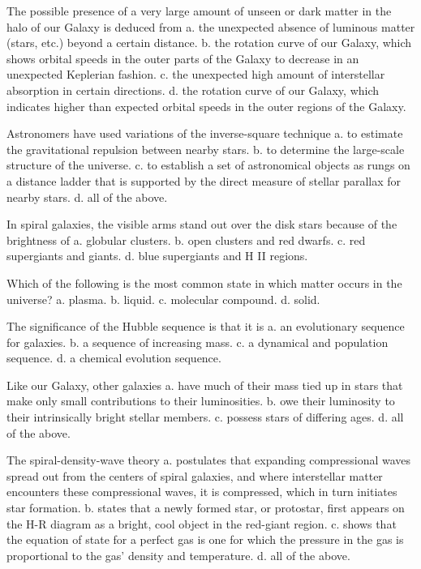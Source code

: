     The possible presence of a very large amount of unseen or dark matter in the halo of our Galaxy is deduced from
    a. the unexpected absence of luminous matter (stars, etc.) beyond a certain distance.
    b. the rotation curve of our Galaxy, which shows orbital speeds in the outer parts of the Galaxy to decrease in an unexpected Keplerian fashion.
    c. the unexpected high amount of interstellar absorption in certain directions.
    d. the rotation curve of our Galaxy, which indicates higher than expected orbital speeds in the outer regions of the Galaxy.

    Astronomers have used variations of the inverse-square technique
    a. to estimate the gravitational repulsion between nearby stars.
    b. to determine the large-scale structure of the universe.
    c. to establish a set of astronomical objects as rungs on a distance ladder that is supported by the direct measure of stellar parallax for nearby stars.
    d. all of the above.

    In spiral galaxies, the visible arms stand out over the disk stars because of the brightness of
    a. globular clusters.
    b. open clusters and red dwarfs.
    c. red supergiants and giants.
    d. blue supergiants and H II regions.

    Which of the following is the most common state in which matter occurs in the universe?
    a. plasma.
    b. liquid.
    c. molecular compound.
    d. solid.

    The significance of the Hubble sequence is that it is
    a. an evolutionary sequence for galaxies.
    b. a sequence of increasing mass.
    c. a dynamical and population sequence.
    d. a chemical evolution sequence.

    Like our Galaxy, other galaxies
    a. have much of their mass tied up in stars that make only small contributions to their luminosities.
    b. owe their luminosity to their intrinsically bright stellar members.
    c. possess stars of differing ages.
    d. all of the above.

    The spiral-density-wave theory
    a. postulates that expanding compressional waves spread out from the centers of spiral galaxies, and where interstellar matter encounters these compressional waves, it is compressed, which in turn initiates star formation.
    b. states that a newly formed star, or protostar, first appears on the H-R diagram as a bright, cool object in the red-giant region.
    c. shows that the equation of state for a perfect gas is one for which the pressure in the gas is proportional to the gas' density and temperature.
    d. all of the above.

